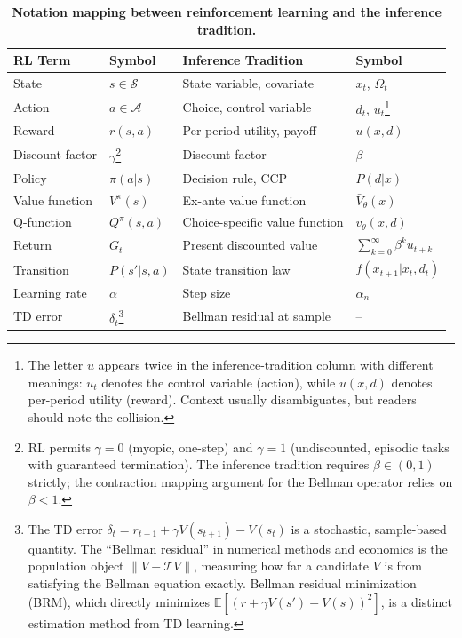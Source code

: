 \begin{table}[h]
\centering
\caption[Notation mapping between reinforcement learning and the inference tradition]{\textbf{Notation mapping between reinforcement learning and the inference tradition.}}
\label{tab:notation}
\begin{tabular}{llll}
\toprule
RL Term & Symbol & Inference Tradition & Symbol \\
\midrule
State & $s \in \mathcal{S}$ & State variable, covariate & $x_t$, $\Omega_t$ \\
Action & $a \in \mathcal{A}$ & Choice, control variable & $d_t$, $u_t$\footnote{The letter $u$ appears twice in the inference-tradition column with different meanings: $u_t$ denotes the control variable (action), while $u(x,d)$ denotes per-period utility (reward). Context usually disambiguates, but readers should note the collision.} \\
Reward & $r(s,a)$ & Per-period utility, payoff & $u(x,d)$ \\
Discount factor & $\gamma$\footnote{RL permits $\gamma = 0$ (myopic, one-step) and $\gamma = 1$ (undiscounted, episodic tasks with guaranteed termination). The inference tradition requires $\beta \in (0,1)$ strictly; the contraction mapping argument for the Bellman operator relies on $\beta < 1$.} & Discount factor & $\beta$ \\
Policy & $\pi(a|s)$ & Decision rule, CCP & $P(d|x)$ \\
Value function & $V^\pi(s)$ & Ex-ante value function & $\bar{V}_\theta(x)$ \\
Q-function & $Q^\pi(s,a)$ & Choice-specific value function & $v_\theta(x,d)$ \\
Return & $G_t$ & Present discounted value & $\sum_{k=0}^\infty \beta^k u_{t+k}$ \\
Transition & $P(s'|s,a)$ & State transition law & $f(x_{t+1} | x_t, d_t)$ \\
Learning rate & $\alpha$ & Step size & $\alpha_n$ \\
TD error & $\delta_t$\footnote{The TD error $\delta_t = r_{t+1} + \gamma V(s_{t+1}) - V(s_t)$ is a stochastic, sample-based quantity. The ``Bellman residual'' in numerical methods and economics is the population object $\|V - \mathcal{T}V\|$, measuring how far a candidate $V$ is from satisfying the Bellman equation exactly. Bellman residual minimization (BRM), which directly minimizes $\mathbb{E}[(r + \gamma V(s') - V(s))^2]$, is a distinct estimation method from TD learning.} & Bellman residual at sample & -- \\
\bottomrule
\end{tabular}
\end{table}
